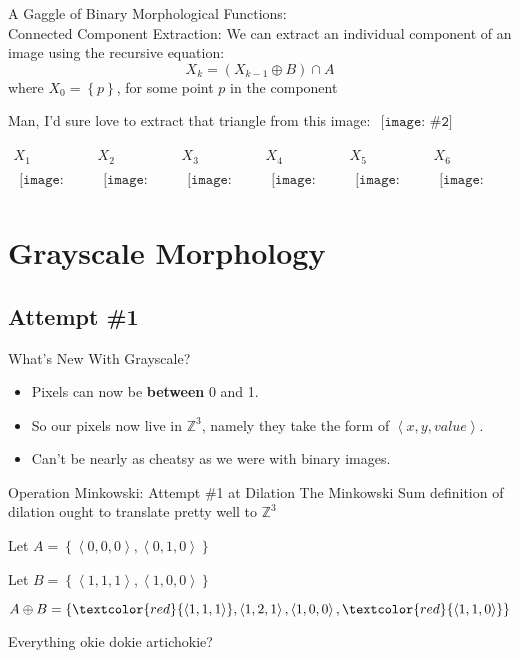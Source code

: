 \documentclass{beamer}
\newcommand{\pic}[2]{
     \begin{array}{l}
      \texttt{[image: \#2]}
      \end{array}
}
\newcommand{\bad}[1]{\textcolor{red}{#1}}
\newcommand{\set}[1]{\left\lbrace #1 \right\rbrace}
\newcommand{\tuple}[1]{\left\langle #1 \right\rangle}
\newcommand{\intersect}{\cap}
\newcommand{\dilate}{\oplus}
\begin{document}
\begin{frame}{A Gaggle of Binary Morphological Functions:\\
              Connected Component Extraction:}
   We can extract an individual component of an image using the recursive
   equation:
   $$X_k = (X_{k-1} \dilate B) \intersect A$$
     where $X_0 = \set{p}$, for some point $p$ in the component

  Man, I'd sure love to extract that triangle from this image: 
$
   \pic{width=20pt}{images/shapes.png}$

   $\begin{array}{c|c|c|c|c|c}
     X_1 & X_2 & X_3 & X_4 & X_5 & X_6\\\hline
     \pic{width=20pt}{images/shapes1.png}
     &\pic{width=20pt}{images/shapes2.png}
     &\pic{width=20pt}{images/shapes3.png}
     &\pic{width=20pt}{images/shapes4.png}
     &\pic{width=20pt}{images/shapes5.png}
     &\pic{width=20pt}{images/shapes6.png}
   \end{array}$

\end{frame}
              
\section{Grayscale Morphology}
\subsection{Attempt \#1}
\begin{frame}{What's New With Grayscale?}
  \begin{itemize}
    \item Pixels can now be \textbf{between} 0 and 1.
    \item So our pixels now live in $\mathbb{Z}^3$, namely
          they take the form of $\tuple{x,y,value}$.
    \item Can't be nearly as cheatsy as we were with binary images.
  \end{itemize}
\end{frame}

\begin{frame}{Operation Minkowski: Attempt \#1 at Dilation}
  The Minkowski Sum definition of dilation ought to translate pretty
        well to $\mathbb{Z}^3$ 

  Let $A = \set{\tuple{0,0,0},\tuple{0,1,0}}$

        Let $B = \set{\tuple{1,1,1},\tuple{1,0,0}}$

        $A \dilate B = \set{\bad{\tuple{1,1,1}},
                            \tuple{1,2,1},
                            \tuple{1,0,0},
                            \bad{\tuple{1,1,0}}}$

  Everything okie dokie artichokie?
\end{frame}
\end{document}
